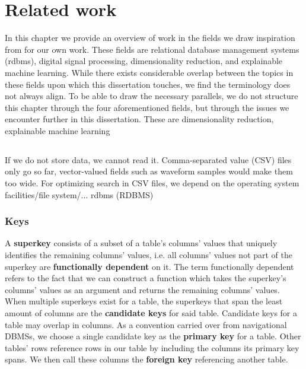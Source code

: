 \chapter{Related work}

In this chapter we provide an overview of work in the fields we draw inspiration from for our own work.
These fields are relational database management systems (\gls{rdbms}), digital signal processing, dimensionality reduction, and explainable machine learning.
While there exists considerable overlap between the topics in these fields upon which this dissertation touches, we find the terminology does not always align.
To be able to draw the necessary parallels, we do not structure this chapter through the four aforementioned fields, but through the issues we encounter further in this dissertation.
These are dimensionality reduction, explainable machine learning

\section{}

If we do not store data, we cannot read it.
Comma-separated value (CSV) files only go so far, vector-valued fields such as waveform samples would make them too wide.
For optimizing search in CSV files, we depend on the operating system facilities/file system/...
\Acrlong{rdbms} (RDBMS)

\subsection{Keys}%

A \textbf{superkey} consists of a subset of a table's columns' values that uniquely identifies the remaining columns' values, i.e. all columns' values not part of the superkey are \textbf{functionally dependent} on it.
The term functionally dependent refers to the fact that we can construct a function which takes the superkey's columns' values as an argument and returns the remaining columns' values.
When multiple superkeys exist for a table, the superkeys that span the least amount of columns are the \textbf{candidate keys} for said table.
Candidate keys for a table may overlap in columns.
As a convention carried over from navigational DBMSs, we choose a single candidate key as the \textbf{primary key} for a table.
Other tables' rows reference rows in our table by including the columns its primary key spans.
We then call these columns the \textbf{foreign key} referencing another table.

